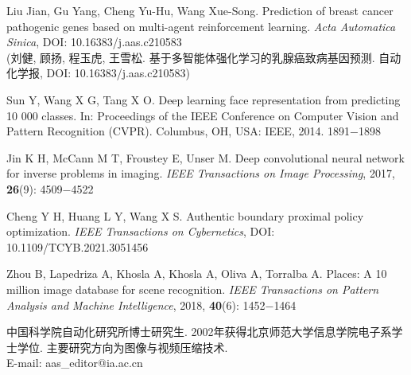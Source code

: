 \documentclass{aas}
\begin{document}
\begin{multicols}{2}
\begin{thebibliography}{99}
  Liu Jian, Gu Yang, Cheng Yu-Hu, Wang Xue-Song. Prediction of breast cancer pathogenic genes based on multi-agent reinforcement learning. {\sl Acta Automatica Sinica}, DOI: 10.16383/j.aas.c210583 \\
 (刘健, 顾扬, 程玉虎, 王雪松. 基于多智能体强化学习的乳腺癌致病基因预测. 自动化学报, DOI: 10.16383/j.aas.c210583)

  Sun Y, Wang X G, Tang X O. Deep learning face representation from predicting 10 000 classes. In: Proceedings of the IEEE Conference on Computer Vision and Pattern Recognition (CVPR). Columbus, OH, USA: IEEE, 2014. 1891$-$1898

 Jin K H, McCann M T, Froustey E, Unser M. Deep convolutional neural network for inverse problems in imaging. {\sl IEEE Transactions on Image Processing}, 2017, {\bf 26}(9): 4509$-$4522



 Cheng Y H, Huang L Y, Wang X S. Authentic boundary proximal policy optimization. {\sl IEEE Transactions on Cybernetics}, DOI: 10.1109/TCYB.2021.3051456

 Zhou B, Lapedriza A, Khosla A, Khosla A, Oliva A, Torralba A. Places: A 10 million image database for scene recognition. {\sl IEEE Transactions on Pattern Analysis and Machine Intelligence}, 2018, {\bf 40}(6): 1452$-$1464
\end{thebibliography}

\begin{biography}
\quad
中国科学院自动化研究所博士研究生.
2002年获得北京师范大学信息学院电子系学士学位.
主要研究方向为图像与视频压缩技术.\\E-mail: aas\_editor@ia.ac.cn


\end{biography}
\end{multicols}
\end{document}
